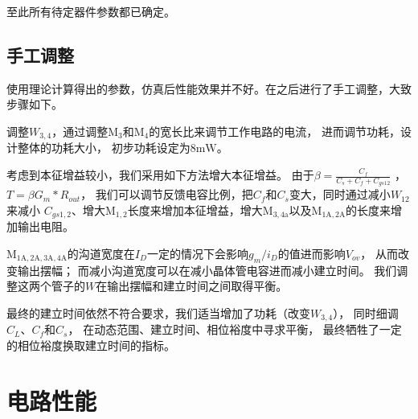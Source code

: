 \documentclass[a4paper]{article}
\newcommand{\umW}{\si{\milli\watt}}
\newcommand{\dM}[1]{\mathrm{M}_\mathrm{#1}}
\newcommand{\DM}[1]{$\dM{#1}$}
\begin{document}
至此所有待定器件参数都已确定。


\subsection{手工调整}
使用理论计算得出的参数，仿真后性能效果并不好。在之后进行了手工调整，大致步骤如下。

调整$W_{3,4}$，通过调整\DM{3}和\DM{4}的宽长比来调节工作电路的电流，
进而调节功耗，设计整体的功耗大小， 初步功耗设定为$8\umW$。

考虑到本征增益较小，我们采用如下方法增大本征增益。
由于$\beta=\frac{C_f}{C_s+C_f+C_{gs12}}$ ， $T=\beta G_m*R_{out}$，
我们可以调节反馈电容比例，把$C_f$和$C_s$变大，同时通过减小$W_{12}$来减小
$C_{gs1,2}$、增大\DM{1,2}长度来增加本征增益，增大\DM{3,4a}以及\DM{1A,2A}的长度来增加输出电阻。

\DM{1A,2A,3A,4A}的沟道宽度在$I_D$一定的情况下会影响$g_m/i_D$的值进而影响$V_{ov}$，
从而改变输出摆幅；
而减小沟道宽度可以在减小晶体管电容进而减小建立时间。
我们调整这两个管子的$W$在输出摆幅和建立时间之间取得平衡。

最终的建立时间依然不符合要求，我们适当增加了功耗（改变$W_{3,4}$），
同时细调$C_L$、$C_f$和$C_s$，
在动态范围、建立时间、相位裕度中寻求平衡，
最终牺牲了一定的相位裕度换取建立时间的指标。

\newpage

\section{电路性能}
\end{document}
